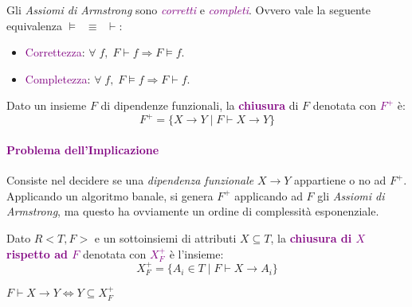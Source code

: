 \begin{theorem}
    Gli \emph{Assiomi di Armstrong} sono \emph{\textcolor{purple}{corretti}}
    e \emph{\textcolor{purple}{completi}}. Ovvero vale la seguente equivalenza
    $\models\;\;\equiv\;\;\vdash$:
    \begin{itemize}
        \item \textcolor{purple}{Correttezza}: $\forall\;f,\;F \vdash f \Rightarrow F \models f$.
        \item \textcolor{purple}{Completezza}: $\forall\;f,\;F \models f \Rightarrow F \vdash f$.
    \end{itemize}
\end{theorem}

\begin{definition}[Chiusura di $F$]
    Dato un insieme $F$ di dipendenze funzionali, la \textbf{\textcolor{purple}{chiusura}} di
    $F$ denotata con \textbf{\textcolor{purple}{$F^+$}} è:
    \begin{equation*}
        F^+ = \{X \rightarrow Y \;|\; F \vdash X \rightarrow Y\}
    \end{equation*}
\end{definition}

\paragraph{\textcolor{purple}{Problema dell'Implicazione}} Consiste nel decidere se una \emph{dipendenza funzionale}
$X \rightarrow Y$ appartiene o no ad $F^+$. Applicando un algoritmo banale, si genera $F^+$ applicando ad $F$
gli \emph{Assiomi di Armstrong}, ma questo ha ovviamente un ordine di complessità esponenziale.

\begin{definition}
    Dato $R<T, F>$ e un sottoinsiemi di attributi $X \subseteq T$, la
    \textbf{\textcolor{purple}{chiusura di $X$ rispetto ad $F$}} denotata con
    \textbf{\textcolor{purple}{$X_{F}^{+}$}} è l'insieme:
    \begin{equation*}
        X_{F}^{+} = \{A_i \in T \;|\; F \vdash X \rightarrow A_i\}
    \end{equation*}
\end{definition}

\begin{theorem}
    $F \vdash X \rightarrow Y \Leftrightarrow Y \subseteq X_{F}^{+}$
\end{theorem}